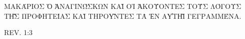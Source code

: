 \clearpage
\thispagestyle{empty}
\null\vfill
\settowidth{}
\begin{center}
\parbox{\longest}{%
  \raggedright{\huge%
    \uppercase{Μακάριος ὁ ἀναγινώσκων καὶ οἱ ἀκούοντες τοὺς λόγους τῆς προφητείας καὶ τηροῦντες τὰ ἐν αὐτῇ γεγραμμένα.} \par\bigskip
  }
  \raggedleft\Large\MakeUppercase{Rev. 1:3}\par%
}
\vfill\vfill
\clearpage\newpage
\end{center}
\newpage